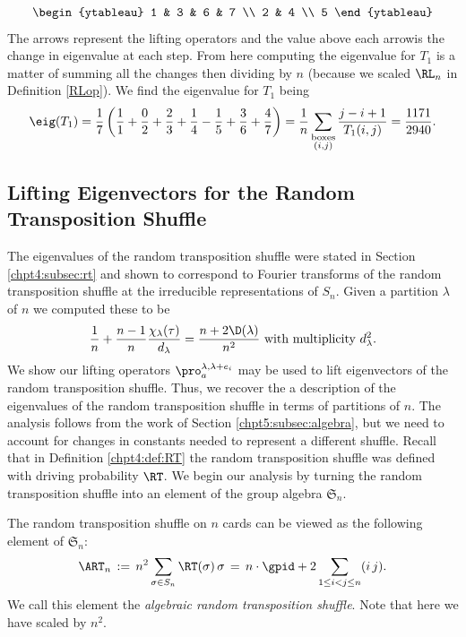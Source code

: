 \documentclass[11pt]{report}
\begin{document}
\begin{example}
\[\begin{ytableau}
	1 & 3 & 6 & 7 \\
	2 & 4 \\
	5
	\end{ytableau} 	\]
	The arrows represent the lifting operators 
	and the value above each arrowis the change in eigenvalue at each step.
	From here computing the eigenvalue for $T_{1}$ is a matter of summing all 
	the changes then dividing by $n$ (because we scaled 
	$\RL_{n}$ in Definition \ref{RLop}). We find the eigenvalue for $T_{1}$ being
	\[\eig(T_{1}) =\frac{1}{7} \left( \frac{1}{1} + \frac{0}{2} + 
	\frac{2}{3} + 
	\frac{1}{4} -\frac{1}{5} + \frac{3}{6} + \frac{4}{7}\right)  =  
	\frac{1}{n}\sum_{\substack{\textnormal{boxes}\\ (i,j)}} 
	\frac{j-i+1}{T_{1}(i,j)} = 
	\frac{1171}{2940} .\]
\end{example}






\subsection{Lifting Eigenvectors for the Random Transposition Shuffle}


The eigenvalues of the random transposition shuffle were stated in Section \ref{chpt4:subsec:rt} and shown to correspond to Fourier transforms of the random transposition shuffle at the irreducible representations of $S_{n}$.
Given a partition $\lambda$ of $n$ we computed these to be
\[ \frac{1}{n} + 
\frac{n-1}{n}\frac{\chi_{\lambda}(\tau)}{d_{\lambda}}  = \frac{n + 2\D(\lambda)}{n^{2}} \textnormal{ with multiplicity } d_{\lambda}^{2}.\]
We show our lifting operators $\pro_{a}^{\lambda,\lambda+e_{i}}$ may be used to lift eigenvectors of the random transposition shuffle. Thus, we recover the a description of the eigenvalues of the random transposition shuffle in terms of partitions of $n$.   The analysis follows from the work of Section \ref{chpt5:subsec:algebra}, but we need to account for changes in constants needed to represent a different shuffle.
Recall that in Definition \ref{chpt4:def:RT} the random transposition shuffle was defined with driving probability $\RT$.	
We begin our analysis by turning the random transposition shuffle into an element of the group algebra $\mathfrak{S}_{n}$.

\begin{defn}
	The random transposition shuffle on $n$ cards can be viewed as the following element of $\mathfrak{S}_{n}$:
	\begin{eqnarray}
	\ART_{n} \, :=  \, n^{2} \sum_{\sigma \in S_{n}} \RT(\sigma) \, \sigma  \, =  \,n \cdot \gpid + 2 \sum_{1\leq i < j \leq n} (i \, j) \label{chpt5:eqn:algrt}.
	\end{eqnarray}
	We call this element the \emph{algebraic random transposition shuffle}. Note that here we have scaled by $n^{2}$.
\end{defn}
\end{document}
